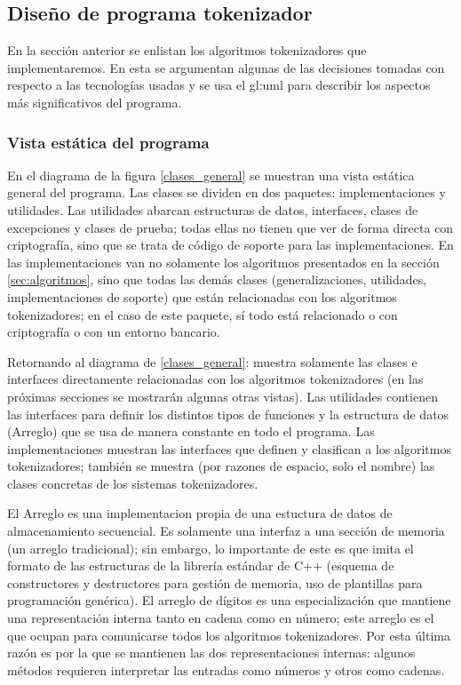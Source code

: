 %
%

\subsection{Diseño de programa tokenizador}

En la sección anterior se enlistan los algoritmos tokenizadores que
implementaremos. En esta se argumentan algunas de las decisiones tomadas
con respecto a las tecnologías usadas y se usa el \gls{gl:uml} para
describir los aspectos más significativos del programa.

\subsubsection{Vista estática del programa}

En el diagrama de la figura \ref{clases_general} se muestran una vista estática
general del programa. Las clases se dividen en dos paquetes: implementaciones
y utilidades. Las utilidades abarcan estructuras de datos, interfaces,
clases de excepciones y clases de prueba; todas ellas no tienen que ver
de forma directa con criptografía, sino que se trata de código de soporte
para las implementaciones. En las implementaciones van no solamente
los algoritmos presentados en la sección \ref{sec:algoritmos}, sino que todas
las demás clases (generalizaciones, utilidades, implementaciones de
soporte) que están relacionadas con los algoritmos tokenizadores; en el caso
de este paquete, sí todo está relacionado o con criptografía o con un
entorno bancario.

Retornando al diagrama de \ref{clases_general}: muestra solamente las clases
e interfaces directamente relacionadas con los algoritmos tokenizadores
(en las próximas secciones se mostrarán algunas otras vistas). Las utilidades
contienen las interfaces para definir los distintos tipos de funciones y la
estructura de datos (Arreglo) que se usa de manera constante en todo el
programa. Las implementaciones muestran las interfaces que definen y clasifican
a los algoritmos tokenizadores; también se muestra (por razones de espacio,
solo el nombre) las clases concretas de los sistemas tokenizadores.

El Arreglo es una implementacion propia de una estuctura de datos de
almacenamiento secuencial. Es solamente una interfaz a una sección
de memoria (un arreglo tradicional); sin embargo, lo importante de este es
que imita el formato de las estructuras de la librería estándar de C++
(esquema de constructores y destructores para gestión de memoria, uso
de plantillas para programación genérica). El arreglo de dígitos es una
especialización que mantiene una representación interna tanto en cadena como
en número; este arreglo es el que ocupan para comunicarse todos los
algoritmos tokenizadores. Por esta última razón es por la que se
mantienen las dos representaciones internas: algunos métodos requieren
interpretar las entradas como números y otros como cadenas.

